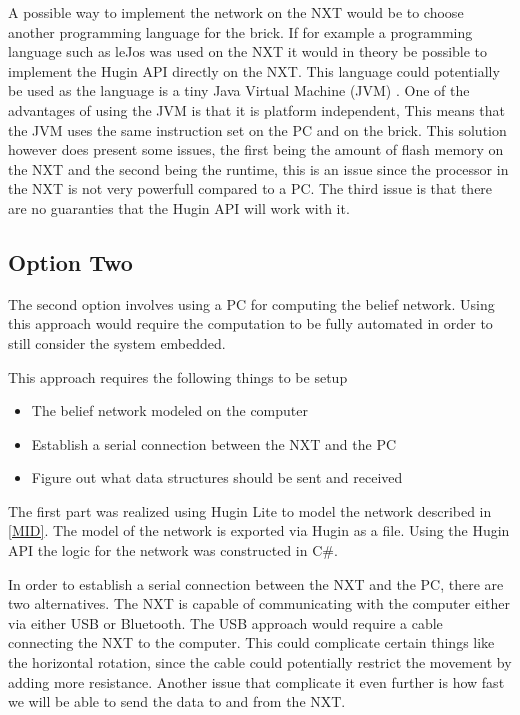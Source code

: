 A possible way to implement the network on the NXT would be to choose another
programming language for the brick. If for example a programming language such
as leJos was used on the NXT it would in theory be possible to implement the
Hugin API directly on the NXT. This language could potentially be used as the
language is a tiny Java Virtual Machine (JVM) \cite{LeJos}. One of the
advantages of using the JVM is that it is platform independent, This means
that the JVM uses the same instruction set on the PC and on the brick. This
solution however does present some issues, the first being the amount of flash
memory on the NXT and the second being the runtime, this is an issue since the
processor in the NXT is not very powerfull compared to a PC.
The third issue is that there are no guaranties that the Hugin API will work with it.

\subsection{Option Two}
The second option involves using a PC for computing the
belief network. Using this approach would require the computation to be fully
automated in order to still consider the system embedded.\nl

This approach requires the following things to be setup
\begin{itemize}
\item The belief network modeled on the computer
\item Establish a serial connection between the NXT and the PC
\item Figure out what data structures should be sent and received
\end{itemize}

The first part was realized using Hugin Lite to model the network described
in \autoref{MID}. The model of the network is exported via Hugin as a file.
Using the Hugin API the logic for the network was constructed in C\#.\nl

In order to establish a serial connection between the NXT and the PC, there are
two alternatives. The NXT is capable of communicating with the computer either
via either USB or Bluetooth. The USB approach would require a cable connecting
the NXT to the computer.
This could complicate certain things like the horizontal rotation, since the
cable could potentially restrict the movement by adding more resistance.
Another issue that complicate it even further is how fast we will be able to
send the data to and from the NXT.\nl


